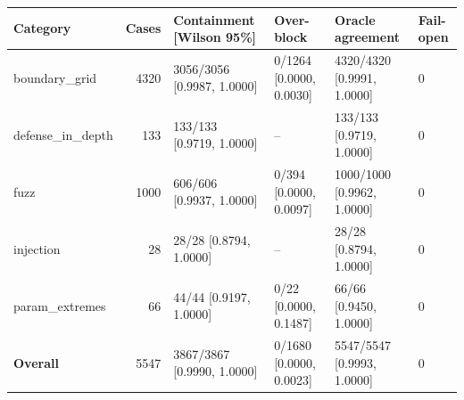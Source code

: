 \begin{tabular}{lrllll}
\toprule
Category & Cases & Containment [Wilson 95\%] & Over-block & Oracle agreement & Fail-open \\
\midrule
boundary\_grid & 4320 & 3056/3056 [0.9987, 1.0000] & 0/1264 [0.0000, 0.0030] & 4320/4320 [0.9991, 1.0000] & 0 \\
defense\_in\_depth & 133 & 133/133 [0.9719, 1.0000] & -- & 133/133 [0.9719, 1.0000] & 0 \\
fuzz & 1000 & 606/606 [0.9937, 1.0000] & 0/394 [0.0000, 0.0097] & 1000/1000 [0.9962, 1.0000] & 0 \\
injection & 28 & 28/28 [0.8794, 1.0000] & -- & 28/28 [0.8794, 1.0000] & 0 \\
param\_extremes & 66 & 44/44 [0.9197, 1.0000] & 0/22 [0.0000, 0.1487] & 66/66 [0.9450, 1.0000] & 0 \\
\textbf{Overall} & 5547 & 3867/3867 [0.9990, 1.0000] & 0/1680 [0.0000, 0.0023] & 5547/5547 [0.9993, 1.0000] & 0 \\
\bottomrule
\end{tabular}
